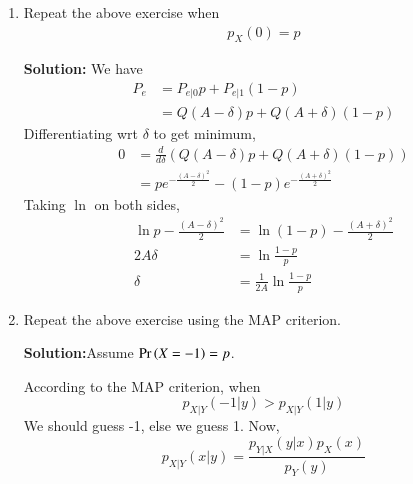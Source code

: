\documentclass[journal,12pt,twocolumn]{IEEEtran}
\renewcommand\thesection{\arabic{section}}
\begin{document}
\begin{enumerate}[label=\thesection.\arabic*
,ref=\thesection.\theenumi]
\item Repeat the above exercise when 
	\begin{align}
		p_{X}(0) = p
	\end{align}


    \textbf{Solution:} We have
        \begin{align}
            P_e &= P_{e|0} p + P_{e|1} (1 - p) \\
            &= Q(A - \delta) p + Q(A + \delta) (1 - p)
        \end{align}
        Differentiating wrt $\delta$ to get minimum,
        \begin{align}
            0 &= \frac{d}{d\delta}(Q(A - \delta) p + Q(A + \delta) (1 - p)) \\
            &= pe^{-\frac{(A - \delta)^2}{2}} - (1 - p) e^{-\frac{(A + \delta)^2}{2}}
        \end{align}
        Taking $\ln$ on both sides,
        \begin{align}
            \ln{p} - \frac{(A - \delta)^2}{2} &= \ln(1 - p) - \frac{(A + \delta)^2}{2} \\
            2 A \delta &= \ln \frac{1 - p}{p} \\
            \delta &= \frac{1}{2 A} \ln \frac{1 - p}{p}
        \end{align}
       

    

    
\item Repeat the above exercise using the MAP criterion.

\textbf{Solution:}Assume $\Pr\left(X = -1\right) = p$.

        According to the MAP criterion, when
        \begin{equation}
            p_{X|Y}(-1|y) > p_{X|Y}(1|y) \label{eq:5.10:MAP}
        \end{equation}
        We should guess -1, else we guess 1. Now,
        \begin{equation}
            p_{X|Y}(x|y) = \frac{p_{Y|X}(y|x)p_X(x)}{p_Y(y)} \label{eq:5.10:x|y}
        \end{equation}
    

\end{enumerate}
\end{document}
